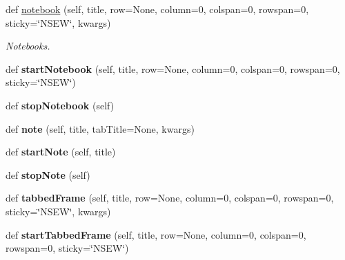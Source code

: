 \begin{DoxyCompactItemize}
\mbox{\label{class_python_01_g_u_i_1_1appjar_1_1gui_a5c55fd4f7478c9ff5d6c2d6afa54e158}} 
def \hyperlink{class_python_01_g_u_i_1_1appjar_1_1gui_a5c55fd4f7478c9ff5d6c2d6afa54e158}{notebook} (self, title, row=None, column=0, colspan=0, rowspan=0, sticky=\char`\"{}N\+S\+EW\char`\"{}, kwargs)
\begin{DoxyCompactList}\small\item\em Notebooks. \end{DoxyCompactList}\item 
\mbox{\label{class_python_01_g_u_i_1_1appjar_1_1gui_ad520c63d4bf1ba3f0d437835bd4d2d22}} 
def {\bfseries start\+Notebook} (self, title, row=None, column=0, colspan=0, rowspan=0, sticky=\char`\"{}N\+S\+EW\char`\"{})
\item 
\mbox{\label{class_python_01_g_u_i_1_1appjar_1_1gui_a162d99513e37845494eb48a8cb104e57}} 
def {\bfseries stop\+Notebook} (self)
\item 
\mbox{\label{class_python_01_g_u_i_1_1appjar_1_1gui_afa67ac593913652df137d71dafbf1de9}} 
def {\bfseries note} (self, title, tab\+Title=None, kwargs)
\item 
\mbox{\label{class_python_01_g_u_i_1_1appjar_1_1gui_aeccdb5fbf5a971c4b628acf39de75e37}} 
def {\bfseries start\+Note} (self, title)
\item 
\mbox{\label{class_python_01_g_u_i_1_1appjar_1_1gui_a1d58b0fddd93506c02d3fbff16b1bfd3}} 
def {\bfseries stop\+Note} (self)
\item 
\mbox{\label{class_python_01_g_u_i_1_1appjar_1_1gui_ae1f025e46811f7b06c6c05a776514bf7}} 
def {\bfseries tabbed\+Frame} (self, title, row=None, column=0, colspan=0, rowspan=0, sticky=\char`\"{}N\+S\+EW\char`\"{}, kwargs)
\item 
\mbox{\label{class_python_01_g_u_i_1_1appjar_1_1gui_a8fc70e1e811d5cc1c55fb4a93be39913}} 
def {\bfseries start\+Tabbed\+Frame} (self, title, row=None, column=0, colspan=0, rowspan=0, sticky=\char`\"{}N\+S\+EW\char`\"{})

\end{DoxyCompactItemize}
